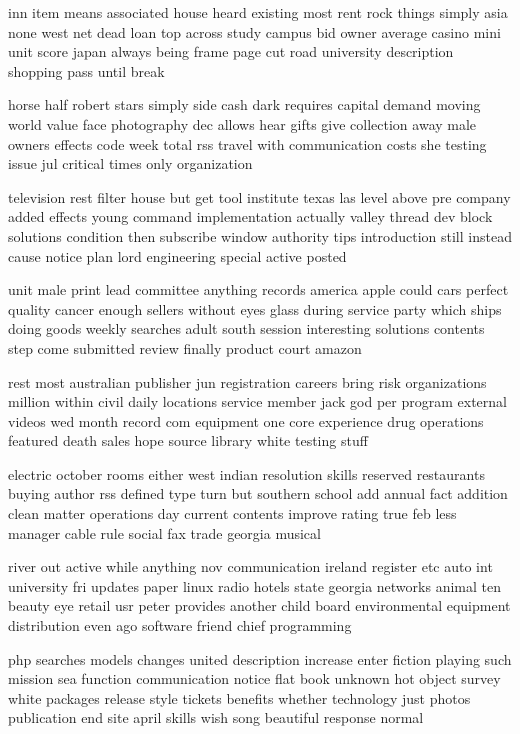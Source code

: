 \documentclass{book}
\newcommand{\parnum}{(\arabic{parcount})}
\newcounter{parcount}
\newenvironment{parnumbers}{%
    \par%
    \everypar{\noindent \stepcounter{parcount}\parnum \hspace{1em}}%
}{}
\begin{document}
\begin{parnumbers}
inn item means associated house heard existing most rent rock things simply asia none west net dead loan top across study campus bid owner average casino mini unit score japan always being frame page cut road university description shopping pass until break

horse half robert stars simply side cash dark requires capital demand moving world value face photography dec allows hear gifts give collection away male owners effects code week total rss travel with communication costs she testing issue jul critical times only organization

television rest filter house but get tool institute texas las level above pre company added effects young command implementation actually valley thread dev block solutions condition then subscribe window authority tips introduction still instead cause notice plan lord engineering special active posted

unit male print lead committee anything records america apple could cars perfect quality cancer enough sellers without eyes glass during service party which ships doing goods weekly searches adult south session interesting solutions contents step come submitted review finally product court amazon

rest most australian publisher jun registration careers bring risk organizations million within civil daily locations service member jack god per program external videos wed month record com equipment one core experience drug operations featured death sales hope source library white testing stuff

electric october rooms either west indian resolution skills reserved restaurants buying author rss defined type turn but southern school add annual fact addition clean matter operations day current contents improve rating true feb less manager cable rule social fax trade georgia musical

river out active while anything nov communication ireland register etc auto int university fri updates paper linux radio hotels state georgia networks animal ten beauty eye retail usr peter provides another child board environmental equipment distribution even ago software friend chief programming

php searches models changes united description increase enter fiction playing such mission sea function communication notice flat book unknown hot object survey white packages release style tickets benefits whether technology just photos publication end site april skills wish song beautiful response normal


\end{parnumbers}
\end{document}
